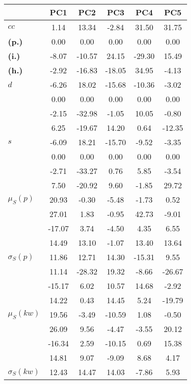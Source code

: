\begin{table}[h!]
\begin{center}
\begin{tabular}{| l || c | c | c | c | c |}\hline
 & {\bf PC1} & {\bf PC2} & {\bf PC3} & {\bf PC4} & {\bf PC5} \\\hline\hline
{\bf $cc$} & 1.14 & 13.34 & -2.84 & 31.50 & 31.75 \\
{\bf (p.)} & 0.00 & 0.00 & 0.00 & 0.00 & 0.00 \\
{\bf (i.)} & -8.07 & -10.57 & 24.15 & -29.30 & 15.49 \\
{\bf (h.)} & -2.92 & -16.83 & -18.05 & 34.95 & -4.13 \\\hline
{\bf $d$} & -6.26 & 18.02 & -15.68 & -10.36 & -3.02 \\
 & 0.00  & 0.00  & 0.00  & 0.00  & 0.00 \\\hline
{\bf } & -2.15 & -32.98 & -1.05 & 10.05 & -0.80 \\
{\bf } & 6.25 & -19.67 & 14.20 & 0.64 & -12.35 \\\hline
{\bf $s$} & -6.09 & 18.21 & -15.70 & -9.52 & -3.35 \\
 & 0.00  & 0.00  & 0.00  & 0.00  & 0.00 \\\hline
 & -2.71  & -33.27  & 0.76  & 5.85  & -3.54 \\
 & 7.50  & -20.92  & 9.60  & -1.85  & 29.72 \\\hline
$\mu_S(p)$ & 20.93  & -0.30  & -5.48  & -1.73  & 0.52 \\
 & 27.01  & 1.83  & -0.95  & 42.73  & -9.01 \\
 & -17.07  & 3.74  & -4.50  & 4.35  & 6.55 \\
 & 14.49  & 13.10  & -1.07  & 13.40  & 13.64 \\\hline
$\sigma_S(p)$ & 11.86  & 12.71  & 14.30  & -15.31  & 9.55 \\
 & 11.14  & -28.32  & 19.32  & -8.66  & -26.67 \\
 & -15.17  & 6.02  & 10.57  & 14.68  & -2.92 \\
 & 14.22  & 0.43  & 14.45  & 5.24  & -19.79 \\\hline
$\mu_S(kw)$ & 19.56  & -3.49  & -10.59  & 1.08  & -0.50 \\
 & 26.09  & 9.56  & -4.47  & -3.55  & 20.12 \\
 & -16.34  & 2.59  & -10.15  & 0.69  & 15.38 \\
 & 14.81  & 9.07  & -9.09  & 8.68  & 4.17 \\\hline
$\sigma_S(kw)$ & 12.43  & 14.47  & 14.03  & -7.86  & 5.93 \\

\end{tabular}
\end{center}
\end{table}
